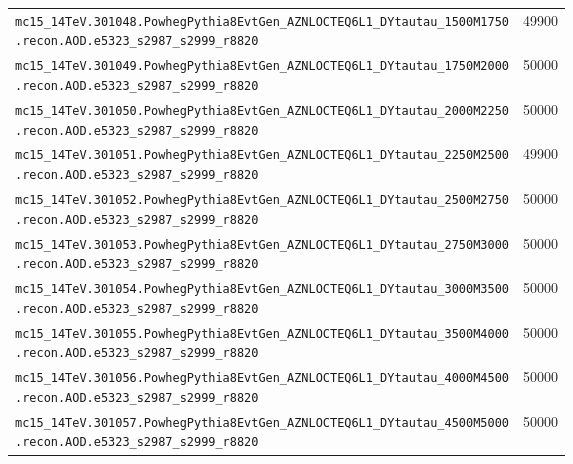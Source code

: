 \begin{table}[htbp]
{\begin{tabular}{p{13cm}S[table-format=6.0]}
    \texttt{mc15\_14TeV.301048.PowhegPythia8EvtGen\_AZNLOCTEQ6L1\_DYtautau\_1500M1750\newline\hspace*{1em}.recon.AOD.e5323\_s2987\_s2999\_r8820} & 49900 \\
    \texttt{mc15\_14TeV.301049.PowhegPythia8EvtGen\_AZNLOCTEQ6L1\_DYtautau\_1750M2000\newline\hspace*{1em}.recon.AOD.e5323\_s2987\_s2999\_r8820} & 50000 \\
    \texttt{mc15\_14TeV.301050.PowhegPythia8EvtGen\_AZNLOCTEQ6L1\_DYtautau\_2000M2250\newline\hspace*{1em}.recon.AOD.e5323\_s2987\_s2999\_r8820} & 50000 \\
    \texttt{mc15\_14TeV.301051.PowhegPythia8EvtGen\_AZNLOCTEQ6L1\_DYtautau\_2250M2500\newline\hspace*{1em}.recon.AOD.e5323\_s2987\_s2999\_r8820} & 49900 \\
    \texttt{mc15\_14TeV.301052.PowhegPythia8EvtGen\_AZNLOCTEQ6L1\_DYtautau\_2500M2750\newline\hspace*{1em}.recon.AOD.e5323\_s2987\_s2999\_r8820} & 50000 \\
    \texttt{mc15\_14TeV.301053.PowhegPythia8EvtGen\_AZNLOCTEQ6L1\_DYtautau\_2750M3000\newline\hspace*{1em}.recon.AOD.e5323\_s2987\_s2999\_r8820} & 50000 \\
    \texttt{mc15\_14TeV.301054.PowhegPythia8EvtGen\_AZNLOCTEQ6L1\_DYtautau\_3000M3500\newline\hspace*{1em}.recon.AOD.e5323\_s2987\_s2999\_r8820} & 50000 \\
    \texttt{mc15\_14TeV.301055.PowhegPythia8EvtGen\_AZNLOCTEQ6L1\_DYtautau\_3500M4000\newline\hspace*{1em}.recon.AOD.e5323\_s2987\_s2999\_r8820} & 50000 \\
    \texttt{mc15\_14TeV.301056.PowhegPythia8EvtGen\_AZNLOCTEQ6L1\_DYtautau\_4000M4500\newline\hspace*{1em}.recon.AOD.e5323\_s2987\_s2999\_r8820} & 50000 \\
    \texttt{mc15\_14TeV.301057.PowhegPythia8EvtGen\_AZNLOCTEQ6L1\_DYtautau\_4500M5000\newline\hspace*{1em}.recon.AOD.e5323\_s2987\_s2999\_r8820} & 50000 \\

\end{tabular}}
\end{table}

